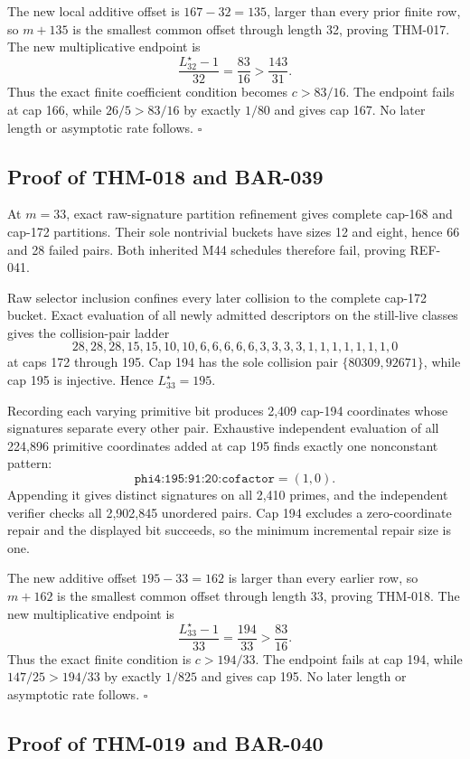 \documentclass[11pt]{article}
\begin{document}
The new local additive offset is \(167-32=135\), larger than every prior
finite row, so \(m+135\) is the smallest common offset through length 32,
proving THM-017. The new multiplicative endpoint is
\[
\frac{L_{32}^{\star}-1}{32}=\frac{83}{16}
 > \frac{143}{31}.
\]
Thus the exact finite coefficient condition becomes \(c>83/16\). The
endpoint fails at cap 166, while \(26/5>83/16\) by exactly \(1/80\) and
gives cap 167. No later length or asymptotic rate follows. \(\square\)

\subsection{Proof of THM-018 and BAR-039}
\label{proof:THM-018-BAR-039}

At \(m=33\), exact raw-signature partition refinement gives complete cap-168
and cap-172 partitions. Their sole nontrivial buckets have sizes 12 and
eight, hence 66 and 28 failed pairs. Both inherited M44 schedules therefore
fail, proving REF-041.

Raw selector inclusion confines every later collision to the complete
cap-172 bucket. Exact evaluation of all newly admitted descriptors on the
still-live classes gives the collision-pair ladder
\[
28,28,28,15,15,10,10,6,6,6,6,6,3,3,3,3,1,1,1,1,1,1,1,0
\]
at caps 172 through 195. Cap 194 has the sole collision pair
\(\{80309,92671\}\), while cap 195 is injective. Hence
\(L_{33}^{\star}=195\).

Recording each varying primitive bit produces 2,409 cap-194 coordinates
whose signatures separate every other pair. Exhaustive independent
evaluation of all 224,896 primitive coordinates added at cap 195 finds
exactly one nonconstant pattern:
\[
\texttt{phi4:195:91:20:cofactor}=(1,0).
\]
Appending it gives distinct signatures on all 2,410 primes, and the
independent verifier checks all 2,902,845 unordered pairs. Cap 194 excludes
a zero-coordinate repair and the displayed bit succeeds, so the minimum
incremental repair size is one.

The new additive offset \(195-33=162\) is larger than every earlier row, so
\(m+162\) is the smallest common offset through length 33, proving THM-018.
The new multiplicative endpoint is
\[
\frac{L_{33}^{\star}-1}{33}=\frac{194}{33}>\frac{83}{16}.
\]
Thus the exact finite condition is \(c>194/33\). The endpoint fails at cap
194, while \(147/25>194/33\) by exactly \(1/825\) and gives cap 195. No
later length or asymptotic rate follows. \(\square\)

\subsection{Proof of THM-019 and BAR-040}
\label{proof:THM-019-BAR-040}
\end{document}
